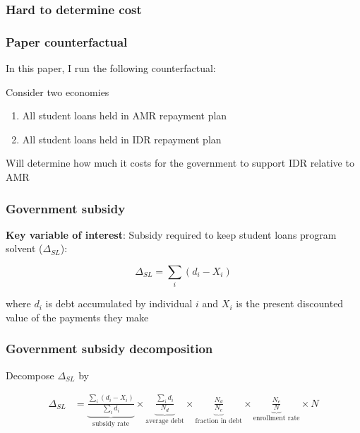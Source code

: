 \documentclass[10pt]{beamer}
\begin{document}
  \begin{frame} \frametitle{Hard to determine cost}


  \end{frame}

  \begin{frame} \frametitle{Paper counterfactual}

    In this paper, I run the following counterfactual:

    \vspace{0.25cm}

    Consider two economies

    \begin{enumerate}
      \item All student loans held in AMR repayment plan
      \item All student loans held in IDR repayment plan
    \end{enumerate}

    Will determine how much it costs for the government to support IDR relative to AMR

  \end{frame}

  \begin{frame} \frametitle{Government subsidy}

      \textbf{Key variable of interest}: Subsidy required to keep student loans program solvent
      ($\Delta_{SL}$):

      \vspace{0.5cm}

      $$\Delta_{SL} = \sum_i (d_i - X_i)$$

      \vspace{0.5cm}

      where $d_i$ is debt accumulated by individual $i$ and $X_i$ is the present discounted value
      of the payments they make

  \end{frame}

  \begin{frame} \frametitle{Government subsidy decomposition}

      Decompose $\Delta_{SL}$ by

      \vspace{0.5cm}

      \begin{align*} \label{eq:gov_subsidy}
        \Delta_{SL} &=
            \underbrace{\frac{\sum_i (d_i - X_i)}{\sum_i d_i}}_{\text{subsidy rate}} \times
            \underbrace{\frac{\sum_i d_i}{N_d}}_{\text{average debt}} \times
            \underbrace{\frac{N_d}{N_e}}_{\text{fraction in debt}} \times
            \underbrace{\frac{N_e}{N}}_{\text{enrollment rate}} \times
            N
      \end{align*}

  \end{frame}
\end{document}
